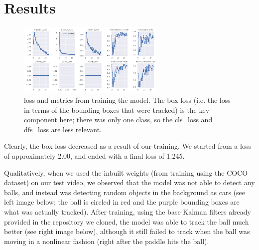 \documentclass[10pt,twocolumn,letterpaper]{article}
\begin{document}
\section{Results}
\begin{figure}
  \centering 
  \includegraphics[width=7cm]{trainingdata.png}
  \caption{loss and metrics from training the model. The box loss (i.e. the loss in terms of the bounding boxes that were tracked) is the key component here; there was only one class, so the cls_loss and dfs_loss are less relevant.}
\end{figure}

Clearly, the box loss decreased as a result of our training. We started from a loss of approximately 2.00, and ended with a final loss of 1.245. 

Qualitatively, when we used the inbuilt weights (from training using the COCO dataset) on our test video, we observed that the model was not able to detect any balls, and instead was detecting random objects in the background as cars (see left image below; the ball is circled in red and the purple bounding boxes are what was actually tracked). After training, using the base Kalman filters already provided in the repository we cloned, the model was able to track the ball much better (see right image below), although it still failed to track when the ball was moving in a nonlinear fashion (right after the paddle hits the ball).
\end{document}

